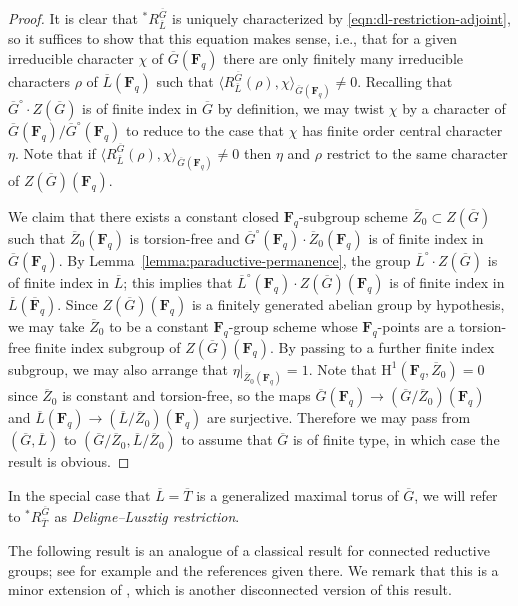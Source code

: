\documentclass[reqno]{amsart}
\numberwithin{equation}{subsection}
\newcommand{\F}{\mathbf{F}}
\newcommand{\ol}[1]{\overline{#1}}
\newcommand{\rH}{\ensuremath{\mathrm{H}}\xspace}
\theoremstyle{remark}
\numberwithin{equation}{subsection}
\numberwithin{figure}{subsection}
\begin{document}
\begin{proof}
    It is clear that ${}^*R^{\ol G}_{\ol L}$ is uniquely characterized by \eqref{eqn:dl-restriction-adjoint}, so it suffices to show that this equation makes sense, i.e., that for a given irreducible character $\chi$ of $\ol G(\F_q)$ there are only finitely many irreducible characters $\rho$ of $\ol L(\F_q)$ such that $\langle R_{\ol L}^{\ol G}(\rho), \chi\rangle_{\ol G(\F_q)} \neq 0$. Recalling that $\ol G^\circ \cdot Z(\ol G)$ is of finite index in $\ol G$ by definition, we may twist $\chi$ by a character of $\ol G(\F_q)/\ol G^\circ(\F_q)$ to reduce to the case that $\chi$ has finite order central character $\eta$. Note that if $\langle R_{\ol L}^{\ol G}(\rho), \chi\rangle_{\ol G(\F_q)} \neq 0$ then $\eta$ and $\rho$ restrict to the same character of $Z(\ol G)(\F_q)$.
    
    We claim that there exists a constant closed $\F_q$-subgroup scheme $\ol Z_0 \subset Z(\ol G)$ such that $\ol Z_0(\F_q)$ is torsion-free and $\ol G^\circ(\F_q) \cdot \ol Z_0(\F_q)$ is of finite index in $\ol G(\F_q)$. By Lemma~\ref{lemma:paraductive-permanence}, the group $\ol L^\circ \cdot Z(\ol G)$ is of finite index in $\ol L$; this implies that $\ol L^\circ(\F_q) \cdot Z(\ol G)(\F_q)$ is of finite index in $\ol L(\ol\F_q)$. Since $Z(\ol G)(\F_q)$ is a finitely generated abelian group by hypothesis, we may take $\ol Z_0$ to be a constant $\F_q$-group scheme whose $\F_q$-points are a torsion-free finite index subgroup of $Z(\ol G)(\F_q)$. By passing to a further finite index subgroup, we may also arrange that $\eta|_{\ol Z_0(\F_q)} = 1$. Note that $\rH^1(\F_q, \ol Z_0) = 0$ since $\ol Z_0$ is constant and torsion-free, so the maps $\ol G(\F_q) \to (\ol G/\ol Z_0)(\F_q)$ and $\ol L(\F_q) \to (\ol L/\ol Z_0)(\F_q)$ are surjective. Therefore we may pass from $(\ol G, \ol L)$ to $(\ol G/\ol Z_0, \ol L/\ol Z_0)$ to assume that $\ol G$ is of finite type, in which case the result is obvious.
\end{proof}

In the special case that $\ol L = \ol T$ is a generalized maximal torus of $\ol G$, we will refer to $^*R^{\ol G}_{\ol T}$ as \emph{Deligne--Lusztig restriction}.

The following result is an analogue of a classical result for connected reductive groups; see for example \cite[Lemma 13.3]{TT20} and the references given there. We remark that this is a minor extension of \cite[Corollaire~2.9]{DM94}, which is another disconnected version of this result.
\end{document}
